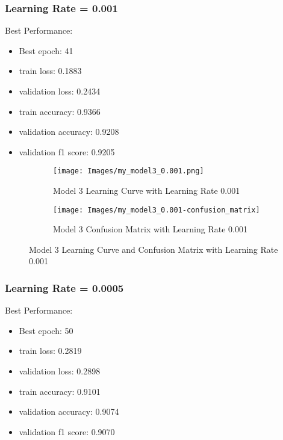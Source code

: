 \documentclass{article}
\begin{document}
\subsubsection{Learning Rate = 0.001}
Best Performance:
\begin{itemize}
    \item Best epoch: 41
    \item train loss: 0.1883
    \item validation loss: 0.2434
    \item train accuracy: 0.9366
    \item validation accuracy: 0.9208
    \item validation f1 score: 0.9205
\end{itemize}

\begin{figure}[h]
    \begin{subfigure}{0.5\textwidth}
        \texttt{[image: Images/my\_model3\_0.001.png]} 
        \caption{Model 3 Learning Curve with Learning Rate 0.001}
        \label{fig:model3_lr_0.001}
    \end{subfigure}
    \begin{subfigure}{0.5\textwidth}
        \texttt{[image: Images/my\_model3\_0.001-confusion\_matrix]} 
        \caption{Model 3 Confusion Matrix with Learning Rate 0.001}
        \label{fig:model3_lr_0.001_confusion_matrix}
    \end{subfigure}
    \caption{Model 3 Learning Curve and Confusion Matrix with Learning Rate 0.001}
    \label{fig:model3_lr_0.001_combined}
\end{figure}

\subsubsection{Learning Rate = 0.0005}
Best Performance:
\begin{itemize}
    \item Best epoch: 50
    \item train loss: 0.2819
    \item validation loss: 0.2898
    \item train accuracy: 0.9101
    \item validation accuracy: 0.9074
    \item validation f1 score: 0.9070
\end{itemize}
\end{document}
